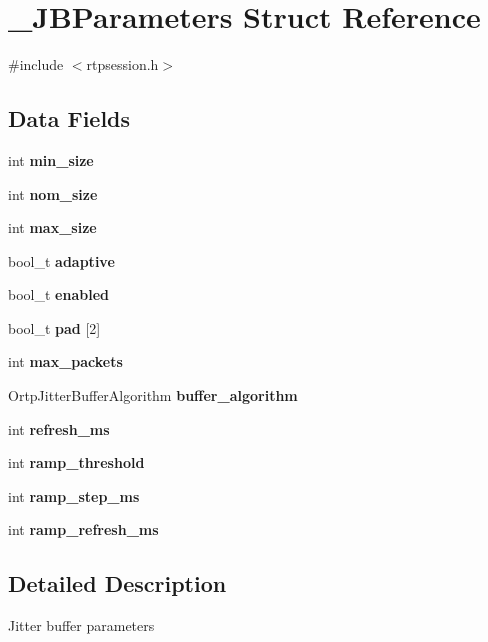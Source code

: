 \section{\+\_\+\+J\+B\+Parameters Struct Reference}
\label{struct__JBParameters}


{\ttfamily \#include $<$rtpsession.\+h$>$}

\subsection*{Data Fields}
\begin{DoxyCompactItemize}
\item 
\mbox{\label{struct__JBParameters_ae1c6efc84d4b13ac7a51697cf2c3f3db}} 
int {\bfseries min\+\_\+size}
\item 
\mbox{\label{struct__JBParameters_ac2bd9139ca489e7c94850364e474c1c5}} 
int {\bfseries nom\+\_\+size}
\item 
\mbox{\label{struct__JBParameters_a043cfa8e14a392925d9f38dd59712301}} 
int {\bfseries max\+\_\+size}
\item 
\mbox{\label{struct__JBParameters_a13546ee329d1449b733ed99a172b4754}} 
bool\+\_\+t {\bfseries adaptive}
\item 
\mbox{\label{struct__JBParameters_ab42bb5577c860d2c94b6f48ca836f97a}} 
bool\+\_\+t {\bfseries enabled}
\item 
\mbox{\label{struct__JBParameters_a6e3d5ad1a18bf35e016e523f8f5fbc9a}} 
bool\+\_\+t {\bfseries pad} [2]
\item 
\mbox{\label{struct__JBParameters_a9e869a10b155f31e87a1974dd480e664}} 
int {\bfseries max\+\_\+packets}
\item 
Ortp\+Jitter\+Buffer\+Algorithm \textbf{ buffer\+\_\+algorithm}
\item 
\mbox{\label{struct__JBParameters_aeed7c9cac4a093b506f45225b838d7b4}} 
int {\bfseries refresh\+\_\+ms}
\item 
\mbox{\label{struct__JBParameters_a0d37240f22cce75ba700ad537c3fe0f6}} 
int {\bfseries ramp\+\_\+threshold}
\item 
\mbox{\label{struct__JBParameters_acf99ff188790b97b659fef96636e84b6}} 
int {\bfseries ramp\+\_\+step\+\_\+ms}
\item 
\mbox{\label{struct__JBParameters_a03e8fcd668f461180f023954a895cab3}} 
int {\bfseries ramp\+\_\+refresh\+\_\+ms}
\end{DoxyCompactItemize}


\subsection{Detailed Description}
Jitter buffer parameters 

